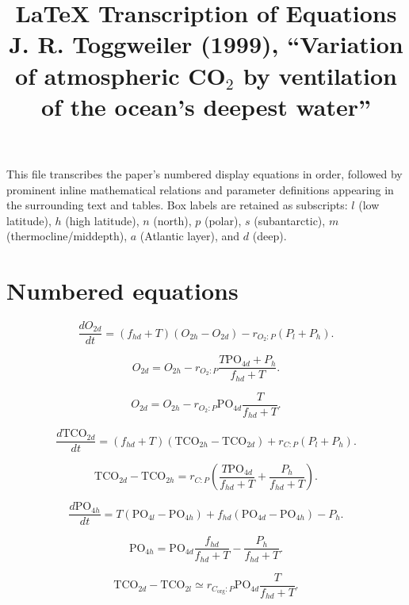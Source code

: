 \documentclass[11pt]{article}
\title{LaTeX Transcription of Equations\\
\large J. R. Toggweiler (1999), ``Variation of atmospheric CO$_2$ by ventilation of the ocean's deepest water''}
\author{}
\date{}
\newcommand{\TCO}[1]{\mathrm{TCO}_{2#1}}
\newcommand{\PO}[1]{\mathrm{PO}_{4#1}}
\begin{document}
\maketitle

\noindent
This file transcribes the paper's numbered display equations in order, followed by prominent inline mathematical relations and parameter definitions appearing in the surrounding text and tables. Box labels are retained as subscripts: $l$ (low latitude), $h$ (high latitude), $n$ (north), $p$ (polar), $s$ (subantarctic), $m$ (thermocline/middepth), $a$ (Atlantic layer), and $d$ (deep).

\section*{Numbered equations}

\begin{equation}
\frac{d O_{2d}}{dt}
=
\left(f_{hd}+T\right)\left(O_{2h}-O_{2d}\right)
-r_{O_2:P}\left(P_l+P_h\right).
\tag{1}
\end{equation}

\begin{equation}
O_{2d}
=
O_{2h}
-r_{O_2:P}
\frac{T\PO{d}+P_h}{f_{hd}+T}.
\tag{2}
\end{equation}

\begin{equation}
O_{2d}
=
O_{2h}
-r_{O_2:P}\PO{d}\frac{T}{f_{hd}+T}.
\tag{3}
\end{equation}

\begin{equation}
\frac{d\TCO{d}}{dt}
=
\left(f_{hd}+T\right)\left(\TCO{h}-\TCO{d}\right)
+r_{C:P}\left(P_l+P_h\right).
\tag{4}
\end{equation}

\begin{equation}
\TCO{d}-\TCO{h}
=
r_{C:P}
\left(
\frac{T\PO{d}}{f_{hd}+T}
+
\frac{P_h}{f_{hd}+T}
\right).
\tag{5}
\end{equation}

\begin{equation}
\frac{d\PO{h}}{dt}
=
T\left(\PO{l}-\PO{h}\right)
+f_{hd}\left(\PO{d}-\PO{h}\right)
-P_h.
\tag{6}
\end{equation}

\begin{equation}
\PO{h}
=
\PO{d}\frac{f_{hd}}{f_{hd}+T}
-
\frac{P_h}{f_{hd}+T}.
\tag{7}
\end{equation}

\begin{equation}
\TCO{d}-\TCO{l}
\simeq
r_{C_{\mathrm{org}}:P}\PO{d}\frac{T}{f_{hd}+T}.
\tag{8}
\end{equation}
\end{document}
